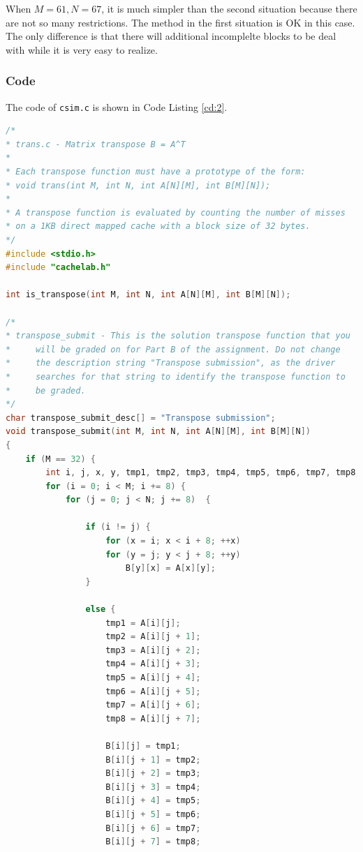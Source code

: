 \documentclass{article}
\begin{document}
When $M = 61, N = 67$, it is much simpler than the second situation because there are not so many restrictions. The method in the first situation is OK in this case. The only difference is that there will additional incomplelte blocks to be deal with while it is very easy to realize.

\subsubsection{Code}

The code of \verb|csim.c| is shown in Code Listing \ref{cd:2}.

\begin{lstlisting}[language=c++, caption={trans.c}, label={cd:2}]
/* 
* trans.c - Matrix transpose B = A^T
*
* Each transpose function must have a prototype of the form:
* void trans(int M, int N, int A[N][M], int B[M][N]);
*
* A transpose function is evaluated by counting the number of misses
* on a 1KB direct mapped cache with a block size of 32 bytes.
*/ 
#include <stdio.h>
#include "cachelab.h"

int is_transpose(int M, int N, int A[N][M], int B[M][N]);

/* 
* transpose_submit - This is the solution transpose function that you
*     will be graded on for Part B of the assignment. Do not change
*     the description string "Transpose submission", as the driver
*     searches for that string to identify the transpose function to
*     be graded. 
*/
char transpose_submit_desc[] = "Transpose submission";
void transpose_submit(int M, int N, int A[N][M], int B[M][N])
{
    if (M == 32) {
        int i, j, x, y, tmp1, tmp2, tmp3, tmp4, tmp5, tmp6, tmp7, tmp8;
        for (i = 0; i < M; i += 8) {
            for (j = 0; j < N; j += 8)  {

                if (i != j) {
                    for (x = i; x < i + 8; ++x)
                    for (y = j; y < j + 8; ++y)
                        B[y][x] = A[x][y];
                }

                else {
                    tmp1 = A[i][j];
                    tmp2 = A[i][j + 1];
                    tmp3 = A[i][j + 2];
                    tmp4 = A[i][j + 3];
                    tmp5 = A[i][j + 4];
                    tmp6 = A[i][j + 5];
                    tmp7 = A[i][j + 6];
                    tmp8 = A[i][j + 7];

                    B[i][j] = tmp1;
                    B[i][j + 1] = tmp2;
                    B[i][j + 2] = tmp3;
                    B[i][j + 3] = tmp4;
                    B[i][j + 4] = tmp5;
                    B[i][j + 5] = tmp6;
                    B[i][j + 6] = tmp7;
                    B[i][j + 7] = tmp8;


\end{lstlisting}
\end{document}
